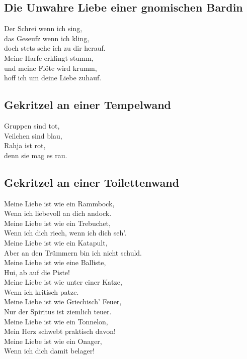 \documentclass[final]{multiversum}
\begin{document}
\subsection{Die Unwahre Liebe einer gnomischen Bardin}
\begin{center}
      Der Schrei wenn ich sing,\\
      das Geseufz wenn ich kling,\\
      doch stets sehe ich zu dir herauf.\\
      Meine Harfe erklingt stumm,\\
      und meine Flöte wird krumm,\\
      hoff ich um deine Liebe zuhauf.\\
\end{center}

\subsection{Gekritzel an einer Tempelwand}
Gruppen sind tot,\\
Veilchen sind blau,\\
Rahja ist rot,\\
denn sie mag es rau.\\

\subsection{Gekritzel an einer Toilettenwand}
Meine Liebe ist wie ein Rammbock,\\
Wenn ich liebevoll an dich andock.\\
Meine Liebe ist wie ein Trebuchet,\\
Wenn ich dich riech, wenn ich dich seh'.\\
Meine Liebe ist wie ein Katapult,\\
Aber an den Trümmern bin ich nicht schuld.\\
Meine Liebe ist wie eine Balliste,\\
Hui, ab auf die Piste!\\
Meine Liebe ist wie unter einer Katze,\\
Wenn ich kritisch patze.\\
Meine Liebe ist wie Griechisch' Feuer,\\
Nur der Spiritus ist ziemlich teuer.\\
Meine Liebe ist wie ein Tonnelon,\\
Mein Herz schwebt praktisch davon!\\
Meine Liebe ist wie ein Onager,\\
Wenn ich dich damit belager!\\
\end{document}
